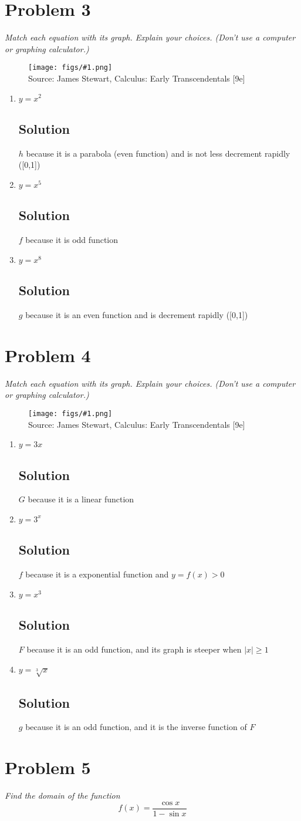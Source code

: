 \documentclass[11pt]{article}
\newcommand{\soln}{\subsection*}
\newcommand{\qn}{\textit}
\newcommand{\imagesource}[1]{{\footnotesize Source: #1}}
\newcommand{\imgqn}[1]{
	\begin{figure}[H]
		\centering
		\texttt{[image: figs/\#1.png]}\\
		\imagesource{James Stewart, Calculus: Early Transcendentals [9e]}
	\end{figure}
}
\begin{document}
\section*{Problem 3}

\qn{Match each equation with its graph. Explain your choices. (Don't use a computer or graphing calculator.)}

\imgqn{1.2.3}

\begin{enumerate}
	\item $y=x^2$
	\soln{Solution}
	$h$ because it is a parabola (even function) and is not less decrement rapidly ([0,1])
	
	\item $y=x^5$
	\soln{Solution}
	$f$ because it is odd function
	
	\item $y=x^8$
	\soln{Solution}
	$g$ because it is an even function and is decrement rapidly ([0,1])
\end{enumerate}

\section*{Problem 4}

\qn{Match each equation with its graph. Explain your choices. (Don't use a computer or graphing calculator.)}

\imgqn{1.2.4}

\begin{enumerate}
	\item $y=3x$
	\soln{Solution}
	$G$ because it is a linear function
	
	\item $y=3^x$
	\soln{Solution}
	$f$ because it is a exponential function and $y=f(x) > 0$
	
	\item $y=x^3$
	\soln{Solution}
	$F$ because it is an odd function, and its graph is steeper when $|x| \ge 1$
	
	\item $y=\sqrt[3]{x}$
	\soln{Solution}
	$g$ because it is an odd function, and it is the inverse function of $F$
\end{enumerate}

\section*{Problem 5}

\qn{Find the domain of the function $$f(x)=\frac{\cos{x}}{1-\sin{x}}$$}
\end{document}
